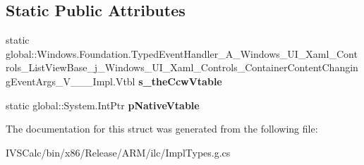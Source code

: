 \subsection*{Static Public Attributes}
\begin{DoxyCompactItemize}
\item 
\mbox{\label{struct_windows_1_1_foundation_1_1_typed_event_handler___a___windows___u_i___xaml___controls___libdb9ee787e603cdc08b3e175469ff6f2_a7bdc6b2414a968544ef76b4941f700d6}} 
static global\+::\+Windows.\+Foundation.\+Typed\+Event\+Handler\+\_\+\+A\+\_\+\+Windows\+\_\+\+U\+I\+\_\+\+Xaml\+\_\+\+Controls\+\_\+\+List\+View\+Base\+\_\+j\+\_\+\+Windows\+\_\+\+U\+I\+\_\+\+Xaml\+\_\+\+Controls\+\_\+\+Container\+Content\+Changing\+Event\+Args\+\_\+\+V\+\_\+\+\_\+\+\_\+\+Impl.\+Vtbl {\bfseries s\+\_\+the\+Ccw\+Vtable}
\item 
\mbox{\label{struct_windows_1_1_foundation_1_1_typed_event_handler___a___windows___u_i___xaml___controls___libdb9ee787e603cdc08b3e175469ff6f2_a6454d2beea07f8fb3bd1eda5caf11c0c}} 
static global\+::\+System.\+Int\+Ptr {\bfseries p\+Native\+Vtable}
\end{DoxyCompactItemize}


The documentation for this struct was generated from the following file\+:\begin{DoxyCompactItemize}
\item 
I\+V\+S\+Calc/bin/x86/\+Release/\+A\+R\+M/ilc/Impl\+Types.\+g.\+cs\end{DoxyCompactItemize}
